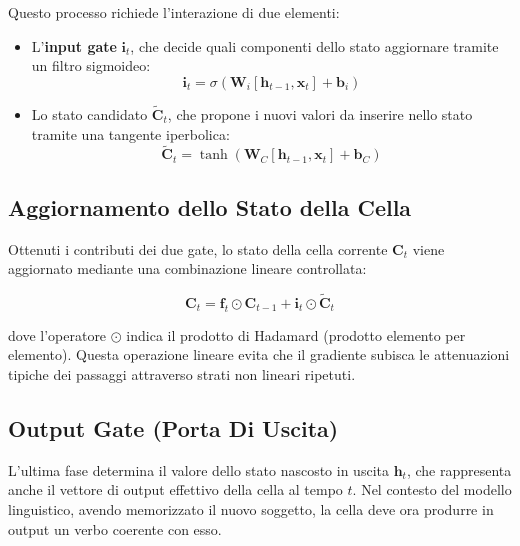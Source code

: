 ﻿\documentclass[11pt, a4paper]{article}
\begin{document}

Questo processo richiede l'interazione di due elementi:
\begin{itemize}
    \item L'\textbf{input gate} $\bm{i}_t$, che decide quali componenti dello stato aggiornare tramite un filtro sigmoideo:
    \[
    \bm{i}_t = \sigma(\bm{W}_i [\bm{h}_{t-1}, \bm{x}_t] + \bm{b}_i)
    \]
    \item Lo stato candidato $\tilde{\bm{C}}_t$, che propone i nuovi valori da inserire nello stato tramite una tangente iperbolica:
    \[
    \tilde{\bm{C}}_t = \tanh(\bm{W}_C [\bm{h}_{t-1}, \bm{x}_t] + \bm{b}_C)
    \]
\end{itemize}

\subsection{Aggiornamento dello Stato della Cella}

Ottenuti i contributi dei due gate, lo stato della cella corrente $\bm{C}_t$ viene aggiornato mediante una combinazione lineare controllata:


\begin{equation}
\boxed{\bm{C}_t = \bm{f}_t \odot \bm{C}_{t-1} + \bm{i}_t \odot \tilde{\bm{C}}_t}
\end{equation}

dove l'operatore $\odot$ indica il prodotto di Hadamard (prodotto elemento per elemento). Questa operazione lineare evita che il gradiente subisca le attenuazioni tipiche dei passaggi attraverso strati non lineari ripetuti.

\subsection{Output Gate (Porta Di Uscita)}

L'ultima fase determina il valore dello stato nascosto in uscita $\bm{h}_t$, che rappresenta anche il vettore di output effettivo della cella al tempo $t$. Nel contesto del modello linguistico, avendo memorizzato il nuovo soggetto, la cella deve ora produrre in output un verbo coerente con esso.
\end{document}
